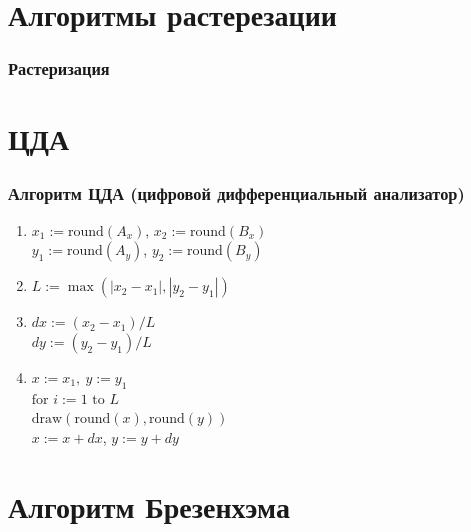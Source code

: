 \documentclass[10pt]{beamer}
\begin{document}
	
	\section{Алгоритмы растерезации}
	\frame{\sectionpage}
	
	
	\begin{frame}\frametitle{Растеризация}
		
		
	\end{frame}
		
	\section{ЦДА}
	
	
	

	\frame{\sectionpage}
	
	
	\begin{frame}\frametitle{Алгоритм ЦДА (цифровой дифференциальный анализатор)}
		{
		}
		{
			\small
			\begin{enumerate}
				\item<+-> $x_1:=\text{round}(A_x)$, $x_2:=\text{round}(B_x)$\\				
					  $y_1:=\text{round}(A_y)$, $y_2:=\text{round}(B_y)$\\
					  
					  
				\item<+-> $L:=\max(|x_2-x_1|,|y_2-y_1|)$
				
				\item<+-> $dx:=(x_2-x_1)/L$\\
				      $dy:=(y_2-y_1)/L$
				      
				\item <+->	$x:=x_1,\ y:=y_1$\\						
						$\text{for }i:=1 \text{ to } L$\\
						\quad $\text{draw}(\text{round}(x),\text{round}(y))$\\
						\quad $x:=x+dx$, $y:=y+dy$ \\
						
			\end{enumerate}
		}
	\end{frame}
	
	\section{Алгоритм Брезенхэма}
	\frame{\sectionpage}
	
\end{document}

